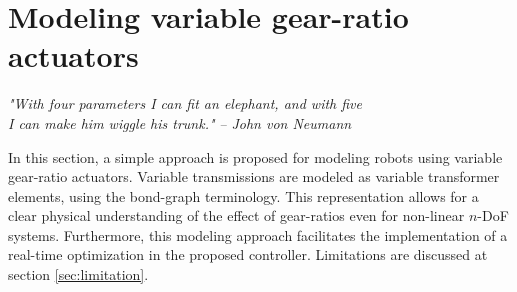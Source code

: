 



\newpage

\section{Modeling variable gear-ratio actuators}
\label{sec:model}

\begin{flushright}
{%
\textit{"With four parameters I can fit an elephant, and with five \\ I can make him wiggle his trunk."}
 }
 \emph{-- John von Neumann}
\end{flushright}
\vspace{+10pt}

In this section, a simple approach is proposed for modeling robots using variable gear-ratio actuators. Variable transmissions are modeled as variable transformer elements, using the bond-graph terminology. This representation allows for a clear physical understanding of the effect of gear-ratios even for non-linear $n$-DoF systems. Furthermore, this modeling approach facilitates the implementation of a real-time optimization in the proposed controller. Limitations are discussed at section \ref{sec:limitation}.

